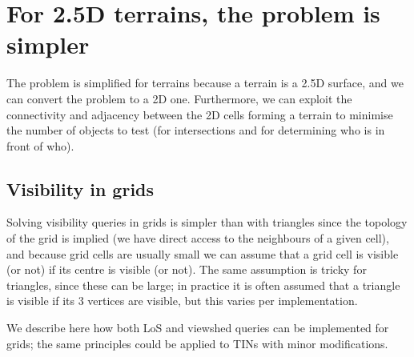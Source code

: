 %
\section[2.5D terrains are simple]{For 2.5D terrains, the problem is simpler}

The problem is simplified for terrains because a terrain is a 2.5D surface, and we can convert the problem to a 2D one.
Furthermore, we can exploit the connectivity and adjacency between the 2D cells forming a terrain to minimise the number of objects to test (for intersections and for determining who is in front of who).



%
\subsection{Visibility in grids}

Solving visibility queries in grids is simpler than with triangles since the topology of the grid is implied (we have direct access to the neighbours of a given cell), and because grid cells are usually small we can assume that a grid cell is visible (or not) if its centre is visible (or not).
The same assumption is tricky for triangles, since these can be large; in practice it is often assumed that a triangle is visible if its 3 vertices are visible, but this varies per implementation.

%

We describe here how both LoS and viewshed queries can be implemented for grids; the same principles could be applied to TINs with minor modifications.


